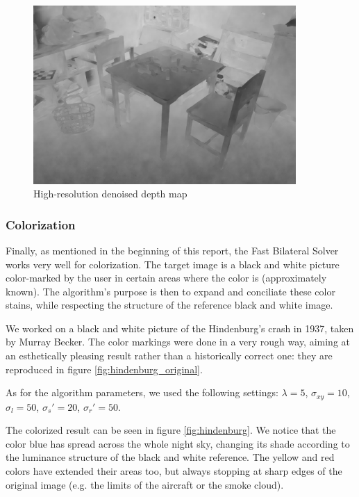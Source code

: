 \documentclass{article}
\begin{document}
\begin{figure}
    \centering
    \includegraphics[width=10cm]{../code/results/depth_superresolution_room_new.png}
    \caption{High-resolution denoised depth map}
    \label{fig:room}
\end{figure}

\subsubsection{Colorization}

Finally, as mentioned in the beginning of this report, the Fast Bilateral Solver works very well for colorization. The target image is a black and white picture color-marked by the user in certain areas where the color is (approximately known). The algorithm's purpose is then to expand and conciliate these color stains, while respecting the structure of the reference black and white image.

\medskip

We worked on a black and white picture of the Hindenburg's crash in 1937, taken by Murray Becker. The color markings were done in a very rough way, aiming at an esthetically pleasing result rather than a historically correct one: they are reproduced in figure \ref{fig:hindenburg_original}.

As for the algorithm parameters, we used the following settings: $\lambda = 5$, $\sigma_{xy} = 10$, $\sigma_l = 50$, $\sigma_s' = 20$, $\sigma_r' = 50$.

\medskip

The colorized result can be seen in figure \ref{fig:hindenburg}. We notice that the color blue has spread across the whole night sky, changing its shade according to the luminance structure of the black and white reference. The yellow and red colors have extended their areas too, but always stopping at sharp edges of the original image (e.g. the limits of the aircraft or the smoke cloud).
\end{document}
